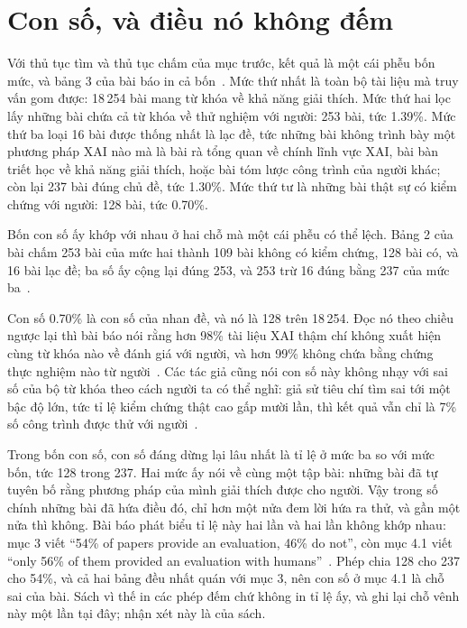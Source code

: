 \section{Con số, và điều nó không đếm}
\label{sec:ch12-con-so-va-cai-no-dem}

%
Với thủ tục tìm và thủ tục chấm của mục trước, kết quả là một cái phễu bốn
mức, và bảng 3 của bài báo in cả bốn~\autocite{p24humangap}. Mức thứ nhất là
toàn bộ tài liệu mà truy vấn gom được: 18\,254 bài mang từ khóa về khả năng
giải thích. Mức thứ hai lọc lấy những bài chứa cả từ khóa về thử nghiệm với
người: 253 bài, tức 1.39\%. Mức thứ ba loại 16 bài được thống nhất là lạc
đề, tức những bài không trình bày một phương pháp XAI nào mà là bài rà tổng
quan về chính lĩnh vực XAI, bài bàn triết học về khả năng giải thích, hoặc bài
tóm lược công trình của người khác; còn lại 237 bài đúng chủ đề, tức 1.30\%. Mức thứ tư là những
bài thật sự có kiểm chứng với người: 128 bài, tức 0.70\%.

Bốn con số ấy khớp với nhau ở hai chỗ mà một cái phễu có thể lệch. Bảng 2 của
bài chấm 253 bài của mức hai thành 109 bài không có kiểm chứng, 128 bài có, và
16 bài lạc đề; ba số ấy cộng lại đúng 253, và 253 trừ 16 đúng bằng 237 của mức
ba~\autocite{p24humangap}.

%
Con số 0.70\% là con số của nhan đề, và nó là 128 trên 18\,254. Đọc nó theo
chiều ngược lại thì bài báo nói rằng hơn 98\% tài liệu XAI thậm chí không xuất
hiện cùng từ khóa nào về đánh giá với người, và hơn 99\% không chứa bằng chứng
thực nghiệm nào từ người~\autocite{p24humangap}. Các tác giả cũng nói con số
này không nhạy với sai số của bộ từ khóa theo cách người ta có thể nghĩ: giả
sử tiêu chí tìm sai tới một bậc độ lớn, tức tỉ lệ kiểm chứng thật cao gấp mười
lần, thì kết quả vẫn chỉ là 7\% số công trình được thử với
người~\autocite{p24humangap}.

Trong bốn con số, con số đáng dừng lại lâu nhất là tỉ lệ ở mức ba so với mức
bốn, tức 128 trong 237. Hai mức ấy nói về cùng một tập bài: những bài đã tự
tuyên bố rằng phương pháp của mình giải thích được cho người. Vậy trong số
chính những bài đã hứa điều đó, chỉ hơn một nửa đem lời hứa ra thử, và gần một
nửa thì không.
Bài báo phát biểu tỉ lệ này hai lần và hai lần không khớp nhau: mục 3 viết
\enquote{54\% of papers provide an evaluation, 46\% do not}, còn mục 4.1 viết
\enquote{only 56\% of them provided an evaluation with
humans}~\autocite{p24humangap}. Phép chia 128 cho 237 cho 54\%, và cả hai bảng
đều nhất quán với mục 3, nên con số ở mục 4.1 là chỗ sai của bài. Sách vì thế
in các phép đếm chứ không in tỉ lệ ấy, và ghi lại chỗ vênh này một lần tại đây;
nhận xét này là của sách.

